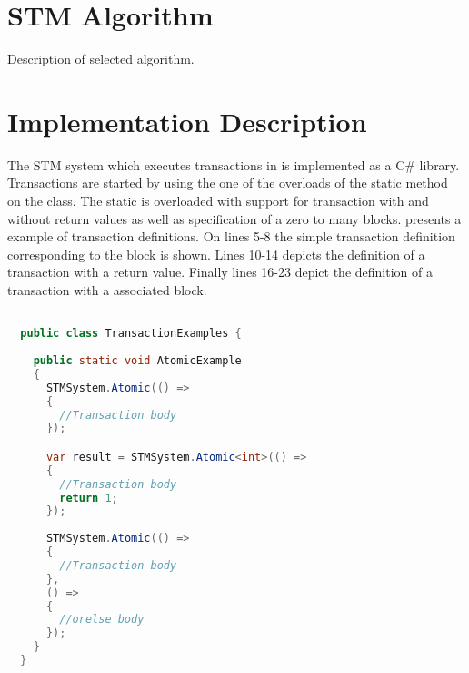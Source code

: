 %
%

\section{STM Algorithm}
Description of selected algorithm.

\section{Implementation Description}
The \ac{STM} system which executes transactions in \stmnamesp is implemented as a C\# library. Transactions are started by using the one of the overloads of the static  method on the  class. The static  is overloaded with support for transaction with and without return values as well as specification of a zero to many  blocks.  presents a example of transaction definitions. On lines 5-8 the simple transaction definition corresponding to the  block is shown. Lines 10-14 depicts the definition of a transaction with a return value. Finally lines 16-23 depict the definition of a transaction with a associated  block. 

\begin{lstlisting}[label=lst:library_atomic,
  caption={Library Transaction Definition},
  language=Java,  
  showspaces=false,
  showtabs=false,
  breaklines=true,
  showstringspaces=false,
  breakatwhitespace=true,
  commentstyle=\color{greencomments},
  keywordstyle=\color{bluekeywords},
  stringstyle=\color{redstrings},
  morekeywords={atomic, retry, orElse, var, get, set}]  % Start your code-block

  public class TransactionExamples {
    
    public static void AtomicExample
    {
      STMSystem.Atomic(() =>
      {
        //Transaction body
      });

      var result = STMSystem.Atomic<int>(() =>
      {
        //Transaction body
        return 1;
      });
      
      STMSystem.Atomic(() =>
      {
        //Transaction body
      },
      () =>
      {
        //orelse body
      });
    }
  }
\end{lstlisting}

